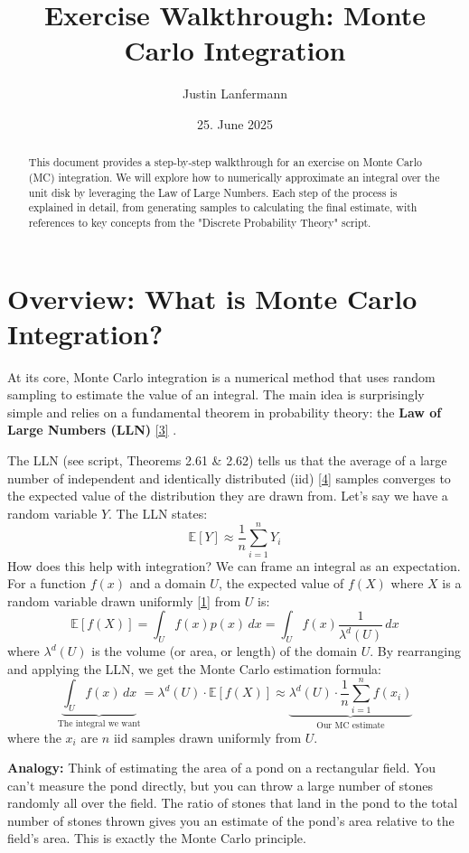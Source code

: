 \documentclass[11pt,a4paper]{article}
\title{Exercise Walkthrough: Monte Carlo Integration}
\author{Justin Lanfermann}
\date{25. June 2025}
\newcommand{\conceptnote}[2]{%
    \hyperlink{#1}{\color{blue!70!black}[#2]}%
}
\begin{document}
\maketitle

\begin{abstract}
    This document provides a step-by-step walkthrough for an exercise on Monte Carlo (MC) integration. We will explore how to numerically approximate an integral over the unit disk by leveraging the Law of Large Numbers. Each step of the process is explained in detail, from generating samples to calculating the final estimate, with references to key concepts from the "Discrete Probability Theory" script.
\end{abstract}

\section{Overview: What is Monte Carlo Integration?}

At its core, Monte Carlo integration is a numerical method that uses random sampling to estimate the value of an integral. The main idea is surprisingly simple and relies on a fundamental theorem in probability theory: the \textbf{Law of Large Numbers (LLN)}\conceptnote{lln}{3}.

The LLN (see script, Theorems 2.61 & 2.62) tells us that the average of a large number of independent and identically distributed (iid)\conceptnote{iid}{4} samples converges to the expected value of the distribution they are drawn from.
Let's say we have a random variable $Y$. The LLN states:
\[ \mathbb{E}[Y] \approx \frac{1}{n}\sum_{i=1}^n Y_i \]
How does this help with integration? We can frame an integral as an expectation. For a function $f(x)$ and a domain $U$, the expected value of $f(X)$ where $X$ is a random variable drawn uniformly\conceptnote{unif}{1} from $U$ is:
\[ \mathbb{E}[f(X)] = \int_U f(x) p(x) \,dx = \int_U f(x) \frac{1}{\lambda^d(U)} \,dx \]
where $\lambda^d(U)$ is the volume (or area, or length) of the domain $U$. By rearranging and applying the LLN, we get the Monte Carlo estimation formula:
\[ \underbrace{\int_U f(x) \,dx}_{\text{The integral we want}} = \lambda^d(U) \cdot \mathbb{E}[f(X)] \approx \underbrace{\lambda^d(U) \cdot \frac{1}{n} \sum_{i=1}^n f(x_i)}_{\text{Our MC estimate}} \]
where the $x_i$ are $n$ iid samples drawn uniformly from $U$.

\textbf{Analogy:} Think of estimating the area of a pond on a rectangular field. You can't measure the pond directly, but you can throw a large number of stones randomly all over the field. The ratio of stones that land in the pond to the total number of stones thrown gives you an estimate of the pond's area relative to the field's area. This is exactly the Monte Carlo principle.
\end{document}
